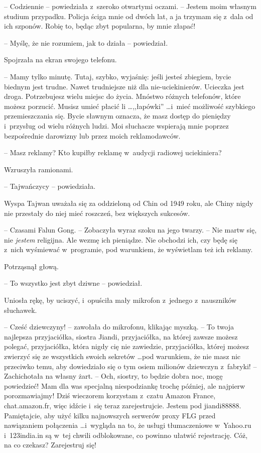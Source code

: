 \documentclass[oneside,polish,11pt,rmheadings]{mwbk}
\begin{document}
-- Codziennie -- powiedziała z~szeroko otwartymi oczami. -- Jestem moim własnym studium przypadku. Policja ściga mnie od dwóch lat, a ja trzymam się z~dala od ich szponów. Robię to, będąc zbyt popularna, by mnie złapać!

-- Myślę, że nie rozumiem, jak to działa -- powiedział.

Spojrzała na ekran swojego telefonu. 

-- Mamy tylko minutę. Tutaj, szybko, wyjaśnię: jeśli jesteś zbiegiem, bycie biednym jest trudne. Nawet trudniejsze niż dla nie-uciekinierów. Ucieczka jest droga. Potrzebujesz wielu miejsc do życia. Mnóstwo różnych telefonów, które możesz porzucić. Musisz umieć płacić li \ldots  ,,łapówki'' \ldots  i~mieć możliwość szybkiego przemieszczania się. Bycie sławnym oznacza, że masz dostęp do pieniędzy i~przysług od wielu różnych ludzi. Moi słuchacze wspierają mnie poprzez bezpośrednie darowizny lub przez moich reklamodawców.

-- Masz reklamy? Kto kupiłby reklamę w~audycji radiowej uciekiniera?

Wzruszyła ramionami. 

-- Tajwańczycy -- powiedziała. 

Wyspa Tajwan uważała się za oddzieloną od Chin od 1949 roku, ale Chiny nigdy nie przestały do niej mieć roszczeń, bez większych sukcesów. 

-- Czasami Falun Gong. -- Zobaczyła wyraz szoku na jego twarzy. -- Nie martw się, nie \textit{jestem }religijna. Ale wezmę ich pieniądze. Nie obchodzi ich, czy będę się z~nich wyśmiewać w~programie, pod warunkiem, że wyświetlam też ich reklamy.

Potrząsnął głową. 

-- To wszystko jest zbyt dziwne -- powiedział.

Uniosła rękę, by uciszyć, i~opuściła mały mikrofon z~jednego z~nauszników słuchawek. 

-- Cześć dziewczyny! -- zawołała do mikrofonu, klikając myszką. -- To twoja najlepsza przyjaciółka, siostra Jiandi, przyjaciółka, na której zawsze możesz polegać, przyjaciółka, która nigdy cię nie zawiedzie, przyjaciółka, której możesz zwierzyć się ze wszystkich swoich sekretów  \ldots  pod warunkiem, że nie masz nic przeciwko temu, aby dowiedziało się o tym osiem milionów dziewczyn z~fabryki! -- Zachichotała na własny żart. -- Och, siostry, to będzie dobra noc, mogę powiedzieć! Mam dla was specjalną niespodziankę trochę później, ale najpierw porozmawiajmy! Dziś wieczorem korzystam z~czatu Amazon France, chat.amazon.fr, więc idźcie i~się teraz zarejestrujcie. Jestem pod jiandi88888. Pamiętajcie, aby użyć kilku najnowszych serwerów proxy FLG przed nawiązaniem połączenia  \ldots  i~wygląda na to, że usługi tłumaczeniowe w~Yahoo.ru i~123india.in są w~tej chwili odblokowane, co powinno ułatwić rejestrację. Cóż, na co czekasz? Zarejestruj się! 
\end{document}
